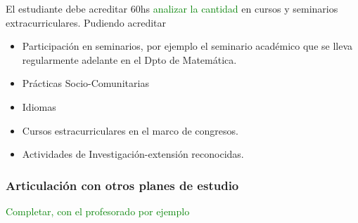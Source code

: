 \documentclass[a4paper, 12pt]{article}
\begin{document}
El estudiante debe acreditar 60hs \textcolor{green}{analizar la cantidad} en cursos y seminarios extracurriculares. Pudiendo acreditar
\begin{itemize}
 \item Participación en seminarios, por ejemplo el seminario académico que se lleva regularmente adelante en el Dpto de Matemática.
 \item Prácticas Socio-Comunitarias 
 \item Idiomas
 \item Cursos estracurriculares en el marco de congresos.
 \item Actividades de Investigación-extensión reconocidas.
 \end{itemize}


\subsubsection{Articulación con otros planes de estudio}

\textcolor{green}{Completar, con el profesorado por ejemplo}
\end{document}
